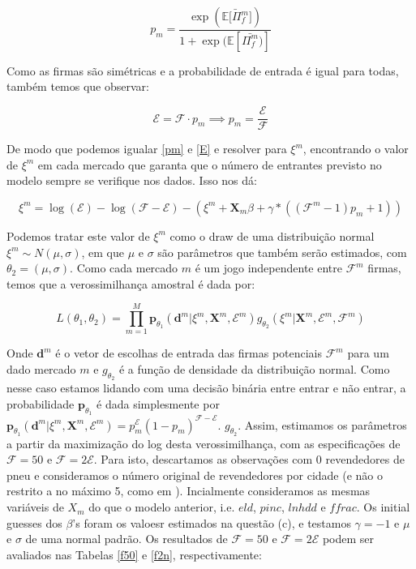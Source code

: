 \documentclass{article}
\begin{document}
\begin{equation}\label{pm}
    p_m = \frac{\exp(\bar{\mathbb{E}[\Pi_f^m}])}{1 + \exp(\mathbb{E}[\bar{\Pi_f^m})]}
\end{equation}

Como as firmas são simétricas e a probabilidade de entrada é igual para todas, também temos que observar:

\begin{equation}\label{E}
    \mathcal{E}=\mathcal{F}\cdot p_m \implies p_m = \frac{\mathcal{E}}{\mathcal{F}}
\end{equation}

De modo que podemos igualar \ref{pm} e \ref{E} e resolver para $\xi^m$, encontrando o valor de $\xi^m$ em cada mercado que garanta que o número de entrantes previsto no modelo sempre se verifique nos dados. Isso nos dá:

\begin{equation*}
    \xi^m = \log(\mathcal{E}) - \log(\mathcal{F}-\mathcal{E}) - (\xi^m+\mathbf{X}_{m}\beta+\gamma*( (\mathcal{F}^m - 1)p_m + 1))
\end{equation*}

Podemos tratar este valor de $\xi^m$ como o draw de uma distribuição normal $\xi^m \sim N(\mu,\sigma)$, em que $\mu$ e $\sigma$ são parâmetros que também serão estimados, com $\theta_2 = (\mu, \sigma)$. Como cada mercado $m$ é um jogo independente entre $\mathcal{F}^m$ firmas, temos que a verossimilhança amostral é dada por:

\begin{equation*}
    L(\theta_1,\theta_2)=\prod\limits_{m=1}^M\mathbf{p}_{\theta_1}(\mathbf{d}^m|\xi^m,\mathbf{X}^m,\mathcal{E}^m)g_{\theta_2}(\xi^m|\mathbf{X}^m,\mathcal{E}^m,\mathcal{F}^m)
\end{equation*}

Onde $\mathbf{d}^m$ é o vetor de escolhas de entrada das firmas potenciais $\mathcal{F}^m$ para um dado mercado $m$ e $g_{\theta_2}$ é a função de densidade da distribuição normal. Como nesse caso estamos lidando com uma decisão binária entre entrar e não entrar, a probabilidade $\mathbf{p}_{\theta_1}$ é dada simplesmente por $\mathbf{p}_{\theta_1}(\mathbf{d}^m|\xi^m,\mathbf{X}^m,\mathcal{E}^m) = p_m^{\mathcal{E}}(1-p_m)^{\mathcal{F} - \mathcal{E}}$. $g_{\theta_2}$. Assim, estimamos os parâmetros a partir da maximização do log desta verossimilhança, com as especificações de $\mathcal{F} = 50$ e $\mathcal{F}= 2 \mathcal{E}$. Para isto, descartamos as observações com 0 revendedores de pneu e consideramos o número original de revendedores por cidade (e não o restrito a no máximo 5, como em ). Incialmente consideramos as mesmas variáveis de $X_m$ do que o modelo anterior, i.e. $eld$, $pinc$, $lnhdd$ e $ffrac$. Os initial guesses dos $\beta$'s foram os valoesr estimados na questão (c), e testamos $\gamma=-1$ e $\mu$ e $\sigma$ de uma normal padrão. Os resultados de $\mathcal{F} = 50$ e $\mathcal{F}= 2 \mathcal{E}$ podem ser avaliados nas Tabelas \ref{f50} e \ref{f2n}, respectivamente:
\end{document}
